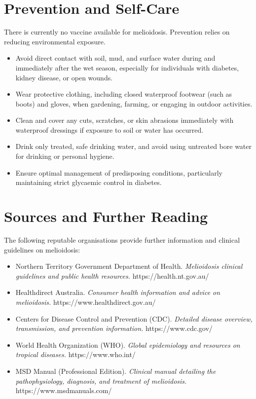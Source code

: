 \section*{Prevention and Self-Care}
There is currently no vaccine available for melioidosis. Prevention relies on reducing environmental exposure.
\begin{itemize}
    \item Avoid direct contact with soil, mud, and surface water during and immediately after the wet season, especially for individuals with diabetes, kidney disease, or open wounds.
    \item Wear protective clothing, including closed waterproof footwear (such as boots) and gloves, when gardening, farming, or engaging in outdoor activities.
    \item Clean and cover any cuts, scratches, or skin abrasions immediately with waterproof dressings if exposure to soil or water has occurred.
    \item Drink only treated, safe drinking water, and avoid using untreated bore water for drinking or personal hygiene.
    \item Ensure optimal management of predisposing conditions, particularly maintaining strict glycaemic control in diabetes.
\end{itemize}

\section*{Sources and Further Reading}
The following reputable organisations provide further information and clinical guidelines on melioidosis:
\begin{itemize}
    \item Northern Territory Government Department of Health. \textit{Melioidosis clinical guidelines and public health resources.} https://health.nt.gov.au/
    \item Healthdirect Australia. \textit{Consumer health information and advice on melioidosis.} https://www.healthdirect.gov.au/
    \item Centers for Disease Control and Prevention (CDC). \textit{Detailed disease overview, transmission, and prevention information.} https://www.cdc.gov/
    \item World Health Organization (WHO). \textit{Global epidemiology and resources on tropical diseases.} https://www.who.int/
    \item MSD Manual (Professional Edition). \textit{Clinical manual detailing the pathophysiology, diagnosis, and treatment of melioidosis.} https://www.msdmanuals.com/
\end{itemize}
